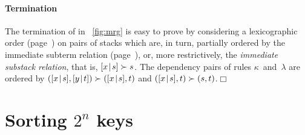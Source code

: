 \paragraph{Termination}
\label{merging_termination}

The termination of  in
\fig~\vref{fig:mrg} is easy to prove by considering a lexicographic
order
(page~\pageref{par:ackermann}) on pairs of stacks which are, in turn,
partially ordered by the immediate subterm
relation
(page~\pageref{par:well-founded}), or, more restrictively, the
\emph{immediate substack relation}, that is, \([{x}\!\mid\!{s}] \succ s\). The dependency
pairs of rules
\(\kappa\)~and~\(\lambda\) are ordered by \(([{x}\!\mid\!{s}],[{y}\!\mid\!{t}])
\succ ([{x}\!\mid\!{s}],t)\) and \(([{x}\!\mid\!{s}],t) \succ
(s,t)\).\hfill\(\Box\)

\section{Sorting $2^n$ keys}
\label{sec:power_of_two}

